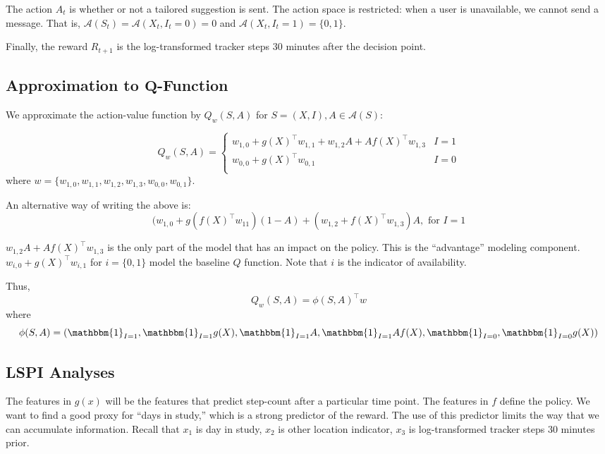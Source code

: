 \documentclass[11pt]{article}
\begin{document}
The action $A_t$ is whether or not a tailored suggestion is sent. The action space is restricted: when a user is unavailable, we cannot send a message. That is, $\mathcal{A}(S_t) = \mathcal{A}(X_t, I_t = 0) = 0$ and $\mathcal{A}(X_t, I_t = 1) = \{0, 1\}$.

Finally, the reward $R_{t+1}$ is the log-transformed tracker steps 30 minutes after the decision point.

\subsection{Approximation to \texorpdfstring{$\boldsymbol{Q}$}{Q}-Function}

We approximate the action-value function by $Q_w(S,A)$ for $S=(X,I), A\in \mathcal{A}(S)$:

$$Q_w(S,A)=
\begin{cases}
  w_{1,0}+g(X)^\top w_{1,1} + w_{1,2}A+Af(X)^\top w_{1,3} & I=1 \\
  w_{0,0}+g(X)^\top w_{0,1} & I=0 \\
\end{cases}
$$
where $w=\{w_{1,0}, w_{1,1},w_{1,2},w_{1,3},w_{0,0},w_{0,1}\}$.

An alternative way of writing the above is:
$$(w_{1,0} + g(f(X)^\top w_{11})(1-A) + (w_{1,2} + f(X)^\top w_{1,3})A, \text{ for } I = 1$$

$w_{1,2}A+Af(X)^\top w_{1,3}$ is the only part of the model that has an impact on the policy. This is the ``advantage'' modeling component. $w_{i,0}+g(X)^\top w_{i,1}$ for $i = \{0, 1\}$ model the baseline $Q$ function. Note that $i$ is the indicator of availability.

Thus, $$Q_w(S,A)=\phi(S,A)^\top w$$ where $$\phi(S,A)=(\mathbbm{1}_{I=1},\mathbbm{1}_{I=1}g(X),\mathbbm{1}_{I=1}A,\mathbbm{1}_{I=1}Af(X),\mathbbm{1}_{I=0},\mathbbm{1}_{I=0}g(X))$$


\subsection{LSPI Analyses}

The features in $g(x)$ will be the features that predict step-count after a particular time point. The features in $f$ define the policy. We want to find a good proxy for ``days in study,'' which is a strong predictor of the reward. The use of this predictor limits the way that we can accumulate information. Recall that $x_1$ is day in study, $x_2$ is other location indicator, $x_3$ is log-transformed tracker steps 30 minutes prior.
\end{document}
